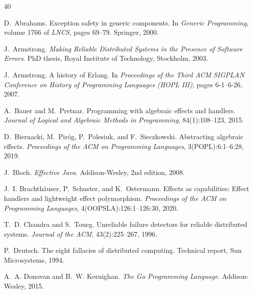 \documentclass[11pt,twocolumn]{article}
\begin{document}
\begin{thebibliography}{40}

D.~Abrahams.
\newblock Exception safety in generic components.
\newblock In \emph{Generic Programming}, volume 1766 of \emph{LNCS}, pages 69--79. Springer, 2000.

J.~Armstrong.
\newblock \emph{Making Reliable Distributed Systems in the Presence of Software Errors}.
\newblock PhD thesis, Royal Institute of Technology, Stockholm, 2003.

J.~Armstrong.
\newblock A history of Erlang.
\newblock In \emph{Proceedings of the Third ACM SIGPLAN Conference on History of Programming Languages (HOPL III)}, pages 6-1--6-26, 2007.

A.~Bauer and M.~Pretnar.
\newblock Programming with algebraic effects and handlers.
\newblock \emph{Journal of Logical and Algebraic Methods in Programming}, 84(1):108--123, 2015.

D.~Biernacki, M.~Pir{\'o}g, P.~Polesiuk, and F.~Sieczkowski.
\newblock Abstracting algebraic effects.
\newblock \emph{Proceedings of the ACM on Programming Languages}, 3(POPL):6:1--6:28, 2019.

J.~Bloch.
\newblock \emph{Effective Java}.
\newblock Addison-Wesley, 2nd edition, 2008.

J.~I. Brachth{\"a}user, P.~Schuster, and K.~Ostermann.
\newblock Effects as capabilities: Effect handlers and lightweight effect polymorphism.
\newblock \emph{Proceedings of the ACM on Programming Languages}, 4(OOPSLA):126:1--126:30, 2020.

T.~D. Chandra and S.~Toueg.
\newblock Unreliable failure detectors for reliable distributed systems.
\newblock \emph{Journal of the ACM}, 43(2):225--267, 1996.

P.~Deutsch.
\newblock The eight fallacies of distributed computing.
\newblock Technical report, Sun Microsystems, 1994.

A.~A. Donovan and B.~W. Kernighan.
\newblock \emph{The Go Programming Language}.
\newblock Addison-Wesley, 2015.


\end{thebibliography}
\end{document}

